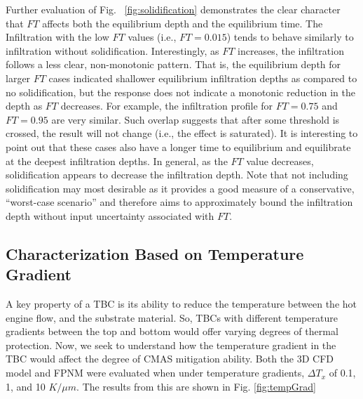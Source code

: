 \documentclass[%
 aip,
 amsmath,amssymb,
 reprint,%
]{revtex4-1}
\begin{document}
Further evaluation of Fig. ~\ref{fig:solidification} demonstrates the clear character that $FT$ affects both the equilibrium depth and the equilibrium time. 
The Infiltration with the low $FT$ values (i.e., $FT=0.015$) tends to behave similarly to infiltration without solidification. 
Interestingly, as $FT$ increases, the infiltration follows a less clear, non-monotonic pattern. 
That is, the equilibrium depth for larger $FT$ cases indicated 
shallower equilibrium infiltration depths as compared to no solidification, but the response does not indicate a monotonic reduction in the depth as $FT$ decreases. 
For example, the infiltration profile for $FT=0.75$ and $FT=0.95$ are very similar.
Such overlap suggests that after some threshold is crossed, the result will not change (i.e., the effect is saturated). 
It is interesting to point out that these cases also have a longer time to equilibrium and equilibrate at the deepest infiltration depths. 
In general, as the $FT$ value decreases, solidification appears to decrease the infiltration depth. 
Note that not including solidification may most desirable as it provides a good measure of a conservative, ``worst-case scenario'' and therefore aims to approximately bound the infiltration depth without input uncertainty associated with $FT$.

 \subsection{Characterization Based on Temperature Gradient}

A key property of a TBC is its ability to reduce the temperature between the hot engine flow, and the substrate material. So, TBCs with different temperature gradients between the top and bottom would offer varying degrees of thermal protection. Now, we seek to understand how the temperature gradient in the TBC would affect the degree of CMAS mitigation ability. Both the 3D CFD model and FPNM were evaluated when under temperature gradients, $\Delta T_{x}$ of 0.1, 1, and 10 $K/\mu m$. The results from this are shown in Fig. \ref{fig:tempGrad}
\end{document}
